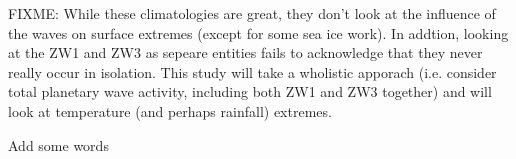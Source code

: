 FIXME: While these climatologies are great, they don't look at the influence of the waves on surface extremes (except for some sea ice work). In addtion, looking at the ZW1 and ZW3 as sepeare entities fails to acknowledge that they never really occur in isolation. This study will take a wholistic apporach (i.e. consider total planetary wave activity, including both ZW1 and ZW3 together) and will look at temperature (and perhaps rainfall) extremes.

Add some words